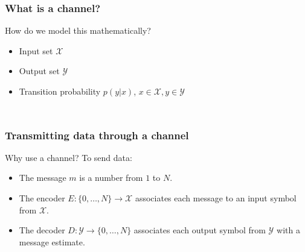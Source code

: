 \documentclass[12pt]{beamer}
\begin{document}
\begin{frame}
\frametitle{What is a channel?}
How do we model this mathematically?
\begin{itemize}
\item Input set $\mathcal{X}$
\item Output set $\mathcal{Y}$
\item Transition probability $p(y|x)$, $x \in \mathcal{X}, y \in \mathcal{Y}$
\end{itemize}

\begin{columns}
  \begin{column}{3cm}
    \begin{figure}
    \end{figure}
  \end{column}
  \begin{column}{5cm}
    \begin{figure}
    \scalebox{1.00}{}
    \end{figure}
  \end{column}
\end{columns}
\end{frame}

\begin{frame}
\frametitle{Transmitting data through a channel}
Why use a channel? To send data:
\begin{itemize}
\item The message $m$ is a number from $1$ to $N$.
\item The encoder $E:\{0,\ldots,N\} \rightarrow \mathcal{X}$ associates each message to an input symbol from $\mathcal{X}$.
\item The decoder $D:\mathcal{Y} \rightarrow \{0,\ldots,N\}$ associates each output symbol from $\mathcal{Y}$ with a message estimate.
\end{itemize}
    \begin{figure}
    \hspace{-2.3cm}\scalebox{0.8}{}
    \end{figure}
\end{frame}
\end{document}
